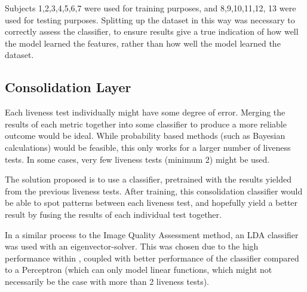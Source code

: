 \documentclass[12pt,a4paper]{article}
\begin{document}
            Subjects 1,2,3,4,5,6,7 were used for training purposes, and 8,9,10,11,12, 13 were used for testing purposes. Splitting up the dataset in this way was necessary to correctly assess the classifier,
            to ensure results give a true indication of how well the model learned the features, rather than how well the model learned the dataset.

    \subsection{Consolidation Layer}
        Each liveness test individually might have some degree of error. Merging the results of each metric together into some classifier to produce a more reliable outcome would be ideal.
        While probability based methods (such as Bayesian calculations) would be feasible, this only works for a larger number of liveness tests. In some cases, very few liveness tests (minimum 2)
        might be used. 

        The solution proposed is to use a classifier, pretrained with the results yielded from the previous liveness tests. After training, this consolidation classifier would be able to spot patterns
        between each liveness test, and hopefully yield a better result by fusing the results of each individual test together. 
        
        In a similar process to the Image Quality Assessment method, an LDA classifier was used with an eigenvector-solver. This was chosen due to the high performance within \cite{ImageQualityAssessmentTest},
        coupled with better performance of the classifier compared to a Perceptron (which can only model linear functions, which might not necessarily be the case with more than 2 liveness tests).
  
\end{document}
